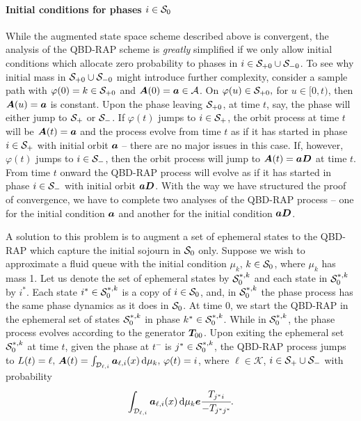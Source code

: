\paragraph{Initial conditions for phases \(i\in\mathcal{S}_0\)}
While the augmented state space scheme described above is convergent, the analysis of the QBD-RAP scheme is \emph{greatly} simplified if we only allow initial conditions which allocate zero probability to phases in \(i\in\mathcal{S}_{+0}\cup\mathcal{S}_{-0}\). To see why initial mass in \(\mathcal S_{+0}\cup\mathcal{S}_{-0}\) might introduce further complexity, consider a sample path with \(\varphi(0)=k\in\mathcal{S}_{+0}\) and \(\boldsymbol A(0)=\boldsymbol a\in\mathcal A\). On \(\varphi(u)\in\mathcal{S}_{+0},\) for \(u\in{}[0,t)\), then \(\boldsymbol A(u) = \boldsymbol a \) is constant. Upon the phase leaving \(\mathcal{S}_{+0}\), at time \(t\), say, the phase will either jump to \(\mathcal{S}_+\) or \(\mathcal{S}_-\). If \(\varphi(t)\) jumps to \(i\in\mathcal{S}_+\), the orbit process at time \(t\) will be \(\boldsymbol A(t)=\boldsymbol a \) and the process evolve from time \(t\) as if it has started in phase \(i\in\mathcal{S}_+\) with initial orbit \(\boldsymbol a \) -- there are no major issues in this case. If, however, \(\varphi(t)\) jumps to \(i\in\mathcal{S}_-\), then the orbit process will jump to \(\boldsymbol A(t) = \boldsymbol a \boldsymbol D\) at time \(t\). From time \(t\) onward the QBD-RAP process will evolve as if it has started in phase \(i\in\mathcal{S}_-\) with initial orbit \(\boldsymbol a \boldsymbol D\). With the way we have structured the proof of convergence, we have to complete two analyses of the QBD-RAP process -- one for the initial condition \(\boldsymbol a\) and another for the initial condition \(\boldsymbol a\boldsymbol D\). 

A solution to this problem is to augment a set of ephemeral states to the QBD-RAP which capture the initial sojourn in \(\mathcal{S}_0\) only. Suppose we wish to approximate a fluid queue with the initial condition \(\mu_k\), \(k\in\mathcal{S}_0\), where \(\mu_k\) has mass 1. Let us denote the set of ephemeral states by \(\mathcal{S}_0^{*,k}\) and each state in \(\mathcal{S}_0^{*,k}\) by \(i^*\). Each state \(i^*\in\mathcal{S}_0^{*,k}\) is a copy of \(i\in\mathcal{S}_0\), and, in \(\mathcal{S}_0^{*,k}\) the phase process has the same phase dynamics as it does in \(\mathcal{S}_0\). At time \(0\), we start the QBD-RAP in the ephemeral set of states \(\mathcal{S}_0^{*,k}\) in phase \(k^*\in\mathcal{S}_0^{*,k}\). While in \(\mathcal{S}_0^{*,k}\), the phase process evolves according to the generator \(\boldsymbol T_{00}\). Upon exiting the ephemeral set \(\mathcal{S}_0^{*,k}\) at time \(t\), given the phase at \(t^-\) is \(j^*\in\mathcal{S}_0^{*,k}\), the QBD-RAP process jumps to \(L(t)=\ell,\, \boldsymbol A(t)=\int_{\mathcal{D}_{\ell,i}}\boldsymbol a_{\ell,i}(x)\, \mathrm{d} \mu_k,\,\varphi(t)=i\), where \(\ell\in\mathcal K\), \(i\in\mathcal{S}_+\cup\mathcal{S}_-\) with probability 
\[\int_{\mathcal{D}_{\ell,i}}\boldsymbol a_{\ell,i}(x)\, \mathrm{d} \mu_k\boldsymbol e\cfrac{T_{j^*i}}{-T_{j^*j^*}}.\] 


